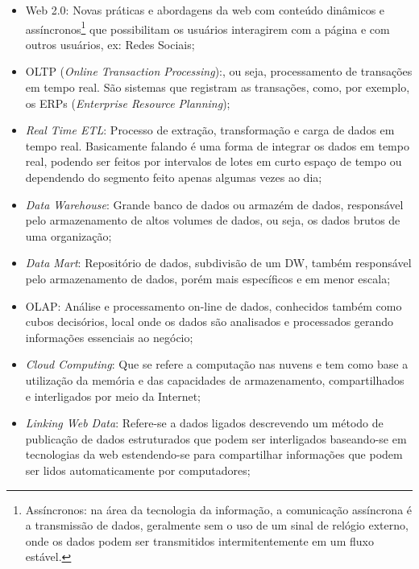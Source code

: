 \begin{itemize}

    \item Web 2.0: Novas pr\'{a}ticas e abordagens da web com conteúdo dinâmicos e ass\'{i}ncronos\footnote{Ass\'{i}ncronos: na \'{a}rea da tecnologia da informa\c{c}\~{a}o, a comunica\c{c}\~{a}o ass\'{i}ncrona \'{e} a transmiss\~{a}o de dados, geralmente sem o uso de um sinal de rel\'{o}gio externo, onde os dados podem ser transmitidos intermitentemente em um fluxo est\'{a}vel.} que possibilitam os usu\'{a}rios interagirem com a p\'{a}gina e com outros usu\'{a}rios, ex: Redes Sociais;
    
    \item OLTP (\textit{Online Transaction Processing}):, ou seja, processamento de transa\c{c}\~{o}es em tempo real. S\~{a}o sistemas que registram as transa\c{c}\~{o}es, como, por exemplo, os ERPs (\textit{Enterprise Resource Planning});
    
    \item \textit{Real Time ETL}: Processo de extra\c{c}\~{a}o, transforma\c{c}\~{a}o e carga de dados em tempo real. Basicamente falando \'{e} uma forma de integrar os dados em tempo real, podendo ser feitos por intervalos de lotes em curto espa\c{c}o de tempo ou dependendo do segmento feito apenas algumas vezes ao dia;
    
    \item \textit{Data Warehouse}: Grande banco de dados ou armaz\'{e}m de dados, respons\'{a}vel pelo armazenamento de altos volumes de dados, ou seja, os dados brutos de uma organiza\c{c}\~{a}o; 
    
    \item \textit{Data Mart}: Reposit\'{o}rio de dados, subdivis\~{a}o de um DW, tamb\'{e}m respons\'{a}vel pelo armazenamento de dados, por\'{e}m mais espec\'{i}ficos e em menor escala;
    
    \item OLAP: An\'{a}lise e processamento on-line de dados, conhecidos tamb\'{e}m como cubos decis\'{o}rios, local onde os dados s\~{a}o analisados e processados gerando informa\c{c}\~{o}es essenciais ao neg\'{o}cio; 
    
    \item \textit{Cloud Computing}: Que se refere a computa\c{c}\~{a}o nas nuvens e tem como base a utiliza\c{c}\~{a}o da mem\'{o}ria e das capacidades de armazenamento, compartilhados e interligados por meio da Internet;
    
    \item \textit{Linking Web Data}: Refere-se a dados ligados descrevendo um m\'{e}todo de publica\c{c}\~{a}o de dados estruturados que podem ser interligados baseando-se em tecnologias da web estendendo-se para compartilhar informa\c{c}\~{o}es que podem ser lidos automaticamente por computadores; 
    

\end{itemize}
